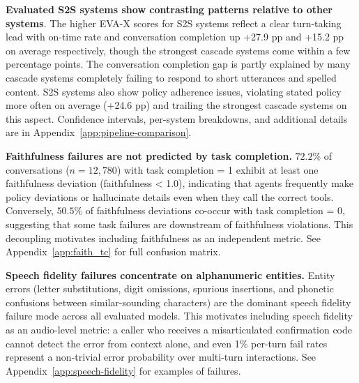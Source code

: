 \textbf{Evaluated S2S systems show contrasting patterns relative to other systems}. The higher EVA-X scores for S2S systems reflect a clear turn-taking lead with on-time rate and conversation completion up +27.9 pp and +15.2 pp on average respectively, though the strongest cascade systems come within a few percentage points. The conversation completion gap is partly explained by many cascade systems completely failing to respond to short utterances and spelled content. S2S systems also show policy adherence issues, violating stated policy more often on average (+24.6 pp) and trailing the strongest cascade systems on this aspect. Confidence intervals, per-system breakdowns, and additional details are in Appendix~\ref{app:pipeline-comparison}.

\textbf{Faithfulness failures are not predicted by task completion.}
$72.2\%$ of conversations ($n=12,780$) with task completion = 1 exhibit at least one faithfulness deviation (faithfulness < 1.0), indicating that agents frequently make policy deviations or hallucinate details even when they call the correct tools. Conversely, $50.5\%$ of faithfulness deviations co-occur with task completion = 0, suggesting that some task failures are downstream of faithfulness violations. This decoupling motivates including faithfulness as an independent metric. See Appendix~\ref{app:faith_tc} for full confusion matrix.

\textbf{Speech fidelity failures concentrate on alphanumeric entities.}
Entity errors (letter substitutions, digit omissions, spurious insertions, and phonetic confusions between similar-sounding characters) are the dominant speech fidelity failure mode across all evaluated models. This motivates including speech fidelity as an audio-level metric: a caller who receives a misarticulated confirmation code cannot detect the error from context alone, and even 1\% per-turn fail rates represent a non-trivial error probability over multi-turn interactions. See Appendix~\ref{app:speech-fidelity} for examples of failures.